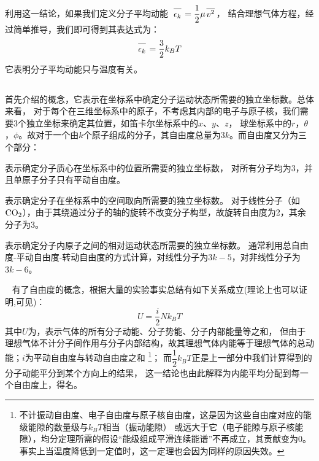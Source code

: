             利用这一结论，如果我们定义分子平均动能\ $\upperline{\epsilon_{k}} = \dfrac{1}{2} \mu \upperline{v^{2}}$，
            结合理想气体方程，经过简单推导，我们即可得到其表达式为：
            \begin{equation}
                \upperline{\epsilon_{k}} = \frac{3}{2}k_{B}T
                \nonumber
            \end{equation}
            它表明分子平均动能只与温度有关。
        \subsection[能量均分原理]{}
            首先介绍的概念，它表示在坐标系中确定分子运动状态所需要的独立坐标数。总体来看，
            对于每个在三维坐标系中的原子，不考虑其内部的电子与原子核，我们需要3个独立坐标来确定其位置，如笛卡尔坐标系中的$x$、$y$、$z$，
            球坐标系中的$r$，$\theta$，$\phi$。故对于一个由$k$个原子组成的分子，其自由度总量为$3k$。而自由度又分为三个部分：
            \begin{Itemize}
                \item {}表示确定分子质心在坐标系中的位置所需要的独立坐标数，
                对所有分子均为3，并且单原子分子只有平动自由度。
                \item {}表示确定分子在坐标系中的空间取向所需要的独立坐标数。
                对于线性分子（如$\rm{CO_{2}}$），由于其绕通过分子的轴的旋转不改变分子构型，故旋转自由度为2，其余分子为3。
                \item {}表示确定分子内原子之间的相对运动状态所需要的独立坐标数。
                通常利用总自由度-平动自由度-转动自由度的方式计算，对线性分子为$3k-5$，对非线性分子为$3k-6$。
            \end{Itemize}
            \ \newline 
            有了自由度的概念，根据大量的实验事实总结有如下关系成立(理论上也可以证明,可见)：
            \begin{equation}
                U = \frac{i}{2}Nk_{B}T
                \nonumber
            \end{equation}
            其中$U$为，表示气体的所有分子动能、分子势能、分子内部能量等之和，
            但由于理想气体不计分子间作用与分子内部结构，故其理想气体内能等于理想气体的总动能；$i$为平动自由度与转动自由度之和
            \footnote{不计振动自由度、电子自由度与原子核自由度，这是因为这些自由度对应的能级能隙的数量级与$k_{B}T$相当（振动能隙）
            或远大于它（电子能隙与原子核能隙），均分定理所需的假设“能级组成平滑连续能谱”不再成立，其贡献变为0。
            事实上当温度降低到一定值时，这一定理也会因为同样的原因失效。}；
            而$\dfrac{1}{2}k_{B}T$正是上一部分中我们计算得到的分子动能平分到某个方向上的结果，
            这一结论也由此解释为内能平均分配到每一个自由度上，得名。
